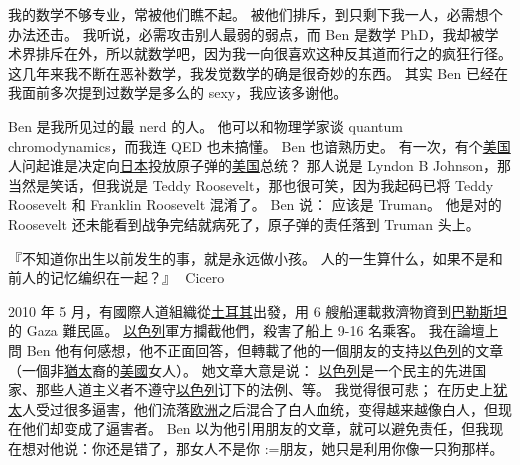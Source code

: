 \documentclass[12pt]{report}
\makeatletter
\newcommand{\tab}{\hspace*{1cm}}
\renewcommand{\d}[1]{$\underaccent{\scalebox{0.5}{\textbullet}}{\textrm{#1}}$}
\newcommand{\ds}[1]{%
  \@tfor\next:=#1\do{\d{\next}}}
\newcommand*\dashh{\textemdash\,\,}
\makeatother
\begin{document}
我的数学不够专业，常被他们瞧不起。 被他们排斥，到只剩下我一人，必需想个办法还击。 我听说，必需攻击别人最弱的弱点，而 Ben 是数学 PhD，我却被学术界排斥在外，所以就数学吧，因为我一向很喜欢这种反其道而行之的疯狂行径。 这几年来我不断在恶补数学，我发觉数学的确是很奇妙的东西。 其实 Ben 已经在我面前多次提到过数学是多么的 sexy，我应该多谢他。

Ben 是我所见过的最 nerd 的人。 他可以和物理学家谈 quantum chromodynamics，而我连 QED 也未搞懂。 Ben 也谙熟历史。  有一次，有个\uline{美国}人问起谁是决定向\uline{日本}投放原子弹的\uline{美国}总统？  那人说是 Lyndon B Johnson，那当然是笑话，但我说是  Teddy Roosevelt，那也很可笑，因为我起码已将 Teddy Roosevelt 和 Franklin Roosevelt 混淆了。 Ben 说： 应该是 Truman。  他是对的 \dashh Roosevelt 还未能看到战争完结就病死了，原子弹的责任落到 Truman 头上。

『不知道你出生以前发生的事，就是永远做小孩。 人的一生算什么，如果不是和前人的记忆编织在一起？』 \tab \dashh Cicero

2010 年 5 月，有國際人道組織從\uline{土耳其}出發，用 6 艘船運載救濟物資到\uline{巴勒斯坦}的 Gaza 難民區。 \uline{以色列}軍方攔截他們，殺害了船上 9-16 名乘客。 我在論壇上問 Ben 他有何感想，他不正面回答，但轉載了他的一個朋友的支持\uline{以色列}的文章（一個非\uline{猶太}裔的\uline{美國}女人）。 她文章大意是说： \uline{以色列}是一个民主的先进国家、那些人道主义者不遵守\uline{以色列}订下的法例、等。 我觉得很可悲； 在历史上\uline{犹太}人受过很多逼害，他们流落\uline{欧洲}之后混合了白人血统，变得越来越像白人，但现在他们却变成了逼害者。 Ben 以为他引用朋友的文章，就可以避免责任，但我现在想对他说：你还是错了，那女人不是你\ds{朋友}，她只是利用你像一只狗那样。


\end{document}
